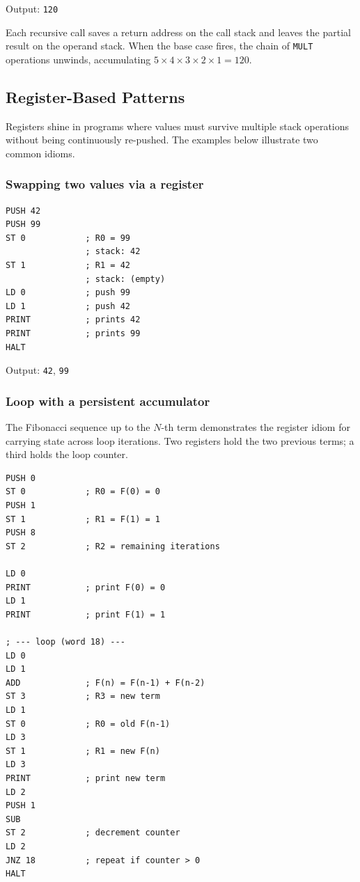 Output: \texttt{120}

Each recursive call saves a return address on the call stack and leaves the partial result on the operand stack. When the base case fires, the chain of \texttt{MULT} operations unwinds, accumulating $5 \times 4 \times 3 \times 2 \times 1 = 120$.

\subsection{Register-Based Patterns}

Registers shine in programs where values must survive multiple stack operations without being continuously re-pushed. The examples below illustrate two common idioms.

\subsubsection*{Swapping two values via a register}

\begin{lstlisting}
PUSH 42
PUSH 99
ST 0            ; R0 = 99
                ; stack: 42
ST 1            ; R1 = 42
                ; stack: (empty)
LD 0            ; push 99
LD 1            ; push 42
PRINT           ; prints 42
PRINT           ; prints 99
HALT
\end{lstlisting}

Output: \texttt{42}, \texttt{99}

\subsubsection*{Loop with a persistent accumulator}

The Fibonacci sequence up to the $N$-th term demonstrates the register idiom for carrying state across loop iterations. Two registers hold the two previous terms; a third holds the loop counter.

\begin{lstlisting}
PUSH 0
ST 0            ; R0 = F(0) = 0
PUSH 1
ST 1            ; R1 = F(1) = 1
PUSH 8
ST 2            ; R2 = remaining iterations

LD 0
PRINT           ; print F(0) = 0
LD 1
PRINT           ; print F(1) = 1

; --- loop (word 18) ---
LD 0
LD 1
ADD             ; F(n) = F(n-1) + F(n-2)
ST 3            ; R3 = new term
LD 1
ST 0            ; R0 = old F(n-1)
LD 3
ST 1            ; R1 = new F(n)
LD 3
PRINT           ; print new term
LD 2
PUSH 1
SUB
ST 2            ; decrement counter
LD 2
JNZ 18          ; repeat if counter > 0
HALT
\end{lstlisting}

